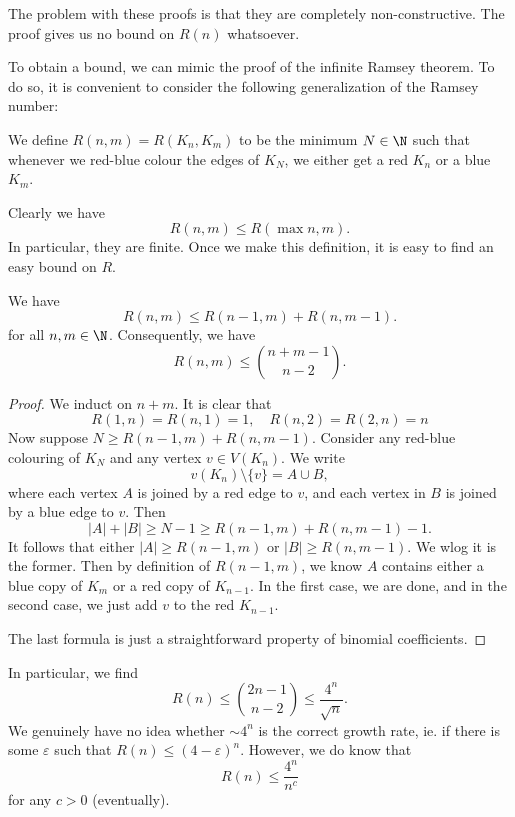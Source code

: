 \documentclass[a4paper]{article}
\begin{document}
The problem with these proofs is that they are completely non-constructive. The proof gives us no bound on $R(n)$ whatsoever.

To obtain a bound, we can mimic the proof of the infinite Ramsey theorem. To do so, it is convenient to consider the following generalization of the Ramsey number: %
\begin{defi}
  We define $R(n, m) = R(K_n, K_m)$ to be the minimum $N \in \N$ such that whenever we red-blue colour the edges of $K_N$, we either get a red $K_n$ or a blue $K_m$.
\end{defi}

Clearly we have
\[
  R(n, m) \leq R(\max{n, m}).
\]
In particular, they are finite. Once we make this definition, it is easy to find an easy bound on $R$.
\begin{thm}
  We have
  \[
    R(n, m) \leq R(n - 1, m) + R(n, m - 1).
  \]
  for all $n, m \in \N$. Consequently, we have
  \[
    R(n, m) \leq \binom{n + m - 1}{n - 2}.
  \]
\end{thm}

\begin{proof}
  We induct on $n + m$. It is clear that
  \[
    R(1, n) = R(n, 1) = 1,\quad R(n, 2) = R(2, n) = n
  \]
  Now suppose $N \geq R(n - 1, m) + R(n, m - 1)$. Consider any red-blue colouring of $K_N$ and any vertex $v \in V(K_n)$. We write
  \[
    v(K_n) \setminus \{v\} = A \cup B,
  \]
  where each vertex $A$ is joined by a red edge to $v$, and each vertex in $B$ is joined by a blue edge to $v$. Then
  \[
    |A| + |B| \geq N - 1 \geq R(n - 1, m) + R(n, m - 1) - 1.
  \]
  It follows that either $|A| \geq R(n - 1, m)$ or $|B| \geq R(n, m - 1)$. We wlog it is the former. Then by definition of $R(n - 1, m)$, we know $A$ contains either a blue copy of $K_m$ or a red copy of $K_{n - 1}$. In the first case, we are done, and in the second case, we just add $v$ to the red $K_{n - 1}$.

  The last formula is just a straightforward property of binomial coefficients.
\end{proof}

In particular, we find
\[
  R(n) \leq \binom{2n - 1}{n - 2} \leq \frac{4^n}{\sqrt{n}}.
\]
We genuinely have no idea whether $\sim 4^n$ is the correct growth rate, ie. if there is some $\varepsilon$ such that $R(n) \leq (4 - \varepsilon)^n$. However, we do know that
\[
  R(n) \leq \frac{4^n}{n^c}
\]
for any $c > 0$ (eventually).
\end{document}
